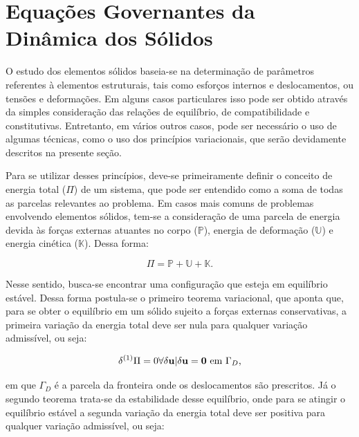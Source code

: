 \documentclass[_ArquivoPrincipal.tex]{subfiles}
\begin{document}
\section{Equações Governantes da Dinâmica dos Sólidos} \label{EGDS}

O estudo dos elementos sólidos baseia-se na determinação de parâmetros referentes à elementos estruturais, tais como esforços internos e deslocamentos, ou tensões e deformações. Em alguns casos particulares isso pode ser obtido através da simples consideração das relações de equilíbrio, de compatibilidade e constitutivas. Entretanto, em vários outros casos, pode ser necessário o uso de algumas técnicas, como o uso dos princípios variacionais, que serão devidamente descritos na presente seção.

Para se utilizar desses princípios, deve-se primeiramente definir o conceito de energia total ($\Pi$) de um sistema, que pode ser entendido como a soma de todas as parcelas relevantes ao problema. Em casos mais comuns de problemas envolvendo elementos sólidos, tem-se a consideração de uma parcela de energia devida às forças externas atuantes no corpo ($\mathbb{P}$), energia de deformação ($\mathbb{U}$) e energia cinética ($\mathbb{K}$). Dessa forma:

\begin{equation}
    \Pi=\mathbb{P}+\mathbb{U}+\mathbb{K}\text{.}
\end{equation}

Nesse sentido, busca-se encontrar uma configuração que esteja em equilíbrio estável. Dessa forma postula-se o primeiro teorema variacional, que aponta que, para se obter o equilíbrio em um sólido sujeito a forças externas conservativas, a primeira variação da energia total deve ser nula para qualquer variação admissível, ou seja:

\begin{equation}
    \delta^{(1)}\Pi=0\forall\delta\mathbf{u}|\delta\mathbf{u}=\mathbf{0}\text{ em }\Gamma_D\text{,}
\end{equation}

\noindent em que $\Gamma_D$ é a parcela da fronteira onde os deslocamentos são prescritos. Já o segundo teorema trata-se da estabilidade desse equilíbrio, onde para se atingir o equilíbrio estável a segunda variação da energia total deve ser positiva para qualquer variação admissível, ou seja:
\end{document}
